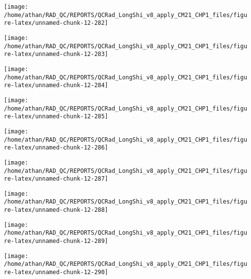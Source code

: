 \documentclass[
  10pt,
  a4paper,oneside]{article}
\begin{document}
\begin{center}\texttt{[image: /home/athan/RAD\_QC/REPORTS/QCRad\_LongShi\_v8\_apply\_CM21\_CHP1\_files/figure-latex/unnamed-chunk-12-282]} \end{center}

\begin{center}\texttt{[image: /home/athan/RAD\_QC/REPORTS/QCRad\_LongShi\_v8\_apply\_CM21\_CHP1\_files/figure-latex/unnamed-chunk-12-283]} \end{center}

\begin{center}\texttt{[image: /home/athan/RAD\_QC/REPORTS/QCRad\_LongShi\_v8\_apply\_CM21\_CHP1\_files/figure-latex/unnamed-chunk-12-284]} \end{center}

\begin{center}\texttt{[image: /home/athan/RAD\_QC/REPORTS/QCRad\_LongShi\_v8\_apply\_CM21\_CHP1\_files/figure-latex/unnamed-chunk-12-285]} \end{center}

\begin{center}\texttt{[image: /home/athan/RAD\_QC/REPORTS/QCRad\_LongShi\_v8\_apply\_CM21\_CHP1\_files/figure-latex/unnamed-chunk-12-286]} \end{center}

\begin{center}\texttt{[image: /home/athan/RAD\_QC/REPORTS/QCRad\_LongShi\_v8\_apply\_CM21\_CHP1\_files/figure-latex/unnamed-chunk-12-287]} \end{center}

\begin{center}\texttt{[image: /home/athan/RAD\_QC/REPORTS/QCRad\_LongShi\_v8\_apply\_CM21\_CHP1\_files/figure-latex/unnamed-chunk-12-288]} \end{center}

\begin{center}\texttt{[image: /home/athan/RAD\_QC/REPORTS/QCRad\_LongShi\_v8\_apply\_CM21\_CHP1\_files/figure-latex/unnamed-chunk-12-289]} \end{center}

\begin{center}\texttt{[image: /home/athan/RAD\_QC/REPORTS/QCRad\_LongShi\_v8\_apply\_CM21\_CHP1\_files/figure-latex/unnamed-chunk-12-290]} \end{center}
\end{document}
